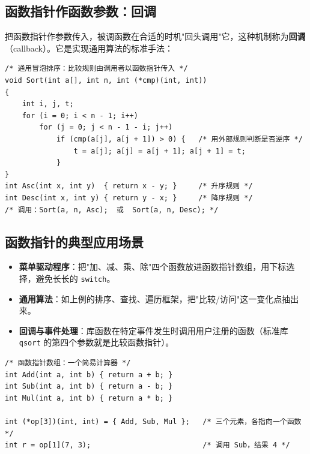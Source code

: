 \subsection{函数指针作函数参数：回调}
把函数指针作参数传入，被调函数在合适的时机"回头调用"它，这种机制称为\textbf{回调}（callback）。它是实现通用算法的标准手法：
\begin{lstlisting}
/* 通用冒泡排序：比较规则由调用者以函数指针传入 */
void Sort(int a[], int n, int (*cmp)(int, int))
{
    int i, j, t;
    for (i = 0; i < n - 1; i++)
        for (j = 0; j < n - 1 - i; j++)
            if (cmp(a[j], a[j + 1]) > 0) {   /* 用外部规则判断是否逆序 */
                t = a[j]; a[j] = a[j + 1]; a[j + 1] = t;
            }
}
int Asc(int x, int y)  { return x - y; }     /* 升序规则 */
int Desc(int x, int y) { return y - x; }     /* 降序规则 */
/* 调用：Sort(a, n, Asc);  或  Sort(a, n, Desc); */
\end{lstlisting}

\subsection{函数指针的典型应用场景}
\begin{itemize}
  \item \textbf{菜单驱动程序}：把"加、减、乘、除"四个函数放进函数指针数组，用下标选择，避免长长的 \texttt{switch}。
  \item \textbf{通用算法}：如上例的排序、查找、遍历框架，把"比较/访问"这一变化点抽出来。
  \item \textbf{回调与事件处理}：库函数在特定事件发生时调用用户注册的函数（标准库 \texttt{qsort} 的第四个参数就是比较函数指针）。
\end{itemize}

\begin{lstlisting}
/* 函数指针数组：一个简易计算器 */
int Add(int a, int b) { return a + b; }
int Sub(int a, int b) { return a - b; }
int Mul(int a, int b) { return a * b; }

int (*op[3])(int, int) = { Add, Sub, Mul };   /* 三个元素，各指向一个函数 */
int r = op[1](7, 3);                          /* 调用 Sub，结果 4 */
\end{lstlisting}


